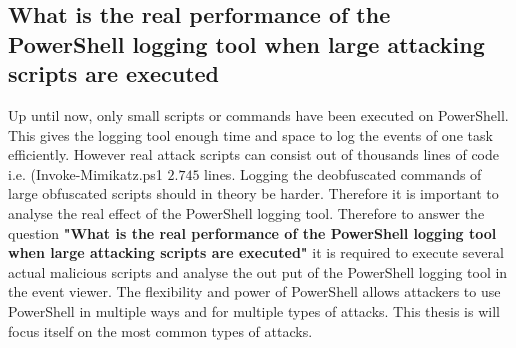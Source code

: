\documentclass{article}%
\begin{document}
\subsection{What is the real performance of the PowerShell logging tool when large attacking scripts are executed}
Up until now, only small scripts or commands have been executed on PowerShell. This gives the logging tool enough time and space to log the events of one task efficiently. However real attack scripts can consist out of thousands lines of code i.e. (Invoke-Mimikatz.ps1 $2.745$ lines. Logging the deobfuscated commands of large obfuscated scripts should in theory be harder. Therefore it is important to analyse the real effect of the PowerShell logging tool. Therefore to answer the question \textbf{"What is the real performance of the PowerShell logging tool when large attacking scripts are executed"} it is required to execute several actual malicious scripts and analyse the out put of the PowerShell logging tool in the event viewer.
\newline
The flexibility and power of PowerShell allows attackers to use PowerShell in multiple ways and for multiple types of attacks. This thesis is will focus itself on the most common types of attacks.
\newline
\end{document}
